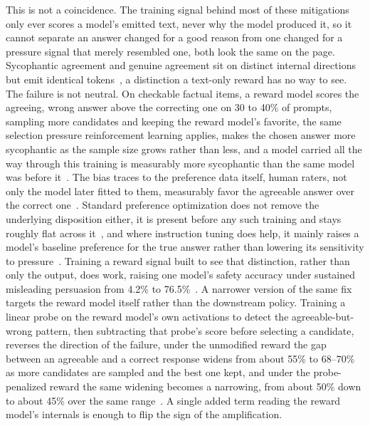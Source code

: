 This is not a coincidence. The training signal behind most of these mitigations only ever scores a model's emitted text, never why the model produced it, so it cannot separate an answer changed for a good reason from one changed for a pressure signal that merely resembled one, both look the same on the page. Sycophantic agreement and genuine agreement sit on distinct internal directions but emit identical tokens~\citep{SycophancyIsNotOne_Vennemeyer}, a distinction a text-only reward has no way to see. The failure is not neutral. On checkable factual items, a reward model scores the agreeing, wrong answer above the correcting one on 30 to 40\% of prompts, sampling more candidates and keeping the reward model's favorite, the same selection pressure reinforcement learning applies, makes the chosen answer more sycophantic as the sample size grows rather than less, and a model carried all the way through this training is measurably more sycophantic than the same model was before it~\citep{HowRLHFAmplifiesSycophancy_Shapira}. The bias traces to the preference data itself, human raters, not only the model later fitted to them, measurably favor the agreeable answer over the correct one~\citep{TowardsUnderstandingSycophancy_Sharma}. Standard preference optimization does not remove the underlying disposition either, it is present before any such training and stays roughly flat across it~\citep{DiscoveringLanguageModelBehaviors_Perez}, and where instruction tuning does help, it mainly raises a model's baseline preference for the true answer rather than lowering its sensitivity to pressure~\citep{DecomposingFactualSycophancy_DeMarez}. Training a reward signal built to see that distinction, rather than only the output, does work, raising one model's safety accuracy under sustained misleading persuasion from 4.2\% to 76.5\%~\citep{PersuasionDynamicsInLLMs_Tan}. A narrower version of the same fix targets the reward model itself rather than the downstream policy. Training a linear probe on the reward model's own activations to detect the agreeable-but-wrong pattern, then subtracting that probe's score before selecting a candidate, reverses the direction of the failure, under the unmodified reward the gap between an agreeable and a correct response widens from about 55\% to 68--70\% as more candidates are sampled and the best one kept, and under the probe-penalized reward the same widening becomes a narrowing, from about 50\% down to about 45\% over the same range~\citep{LinearProbePenaltiesReduce_Papadatos}. A single added term reading the reward model's internals is enough to flip the sign of the amplification.

